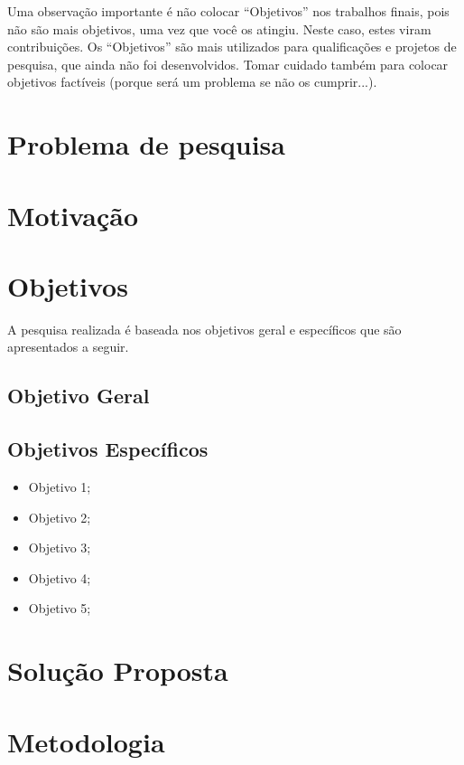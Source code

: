 Uma observação importante é não colocar ``Objetivos'' nos trabalhos finais, pois não são mais objetivos, uma vez que você os atingiu. Neste caso, estes viram contribuições. Os ``Objetivos'' são mais utilizados para qualificações e projetos de pesquisa, que ainda não foi desenvolvidos. Tomar cuidado também para colocar objetivos factíveis (porque será um problema se não os cumprir...).

\section{Problema de pesquisa}
\label{sec:problema}

\section{Motivação}


\section{Objetivos}

A pesquisa realizada é baseada nos objetivos geral e específicos que são apresentados a seguir.

\subsection{Objetivo Geral}

\subsection{Objetivos Específicos}

\begin{itemize}
    \item Objetivo 1;
    \item Objetivo 2;
    \item Objetivo 3;
    \item Objetivo 4;
    \item Objetivo 5;
\end{itemize}

\section{Solução Proposta}
\label{sec:solucao}

\section{Metodologia}
\label{sec:metodologia}

